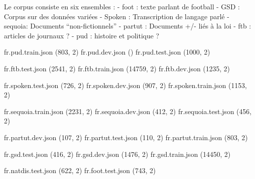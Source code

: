 \documentclass{report}
\begin{document}
Le corpus consiste en six ensembles :
- foot : texte parlant de football  
- GSD : Corpus sur des données variées
- Spoken : Transcription de langage parlé
- sequoia: Documents ``non-fictionnels''
- partut : Documents +/- liés à la loi
- ftb : articles de journaux ?
- pud : histoire et politique ?

fr.pud.train.json 	 (803, 2)
fr.pud.dev.json 	 ()
fr.pud.test.json 	 (1000, 2)

fr.ftb.test.json 	 (2541, 2)
fr.ftb.train.json 	 (14759, 2)
fr.ftb.dev.json 	 (1235, 2)

fr.spoken.test.json 	 (726, 2)
fr.spoken.dev.json 	 (907, 2)
fr.spoken.train.json 	 (1153, 2)

fr.sequoia.train.json 	 (2231, 2)
fr.sequoia.dev.json 	 (412, 2)
fr.sequoia.test.json 	 (456, 2)

fr.partut.dev.json 	 (107, 2)
fr.partut.test.json 	 (110, 2)
fr.partut.train.json 	 (803, 2)

fr.gsd.test.json 	 (416, 2)
fr.gsd.dev.json 	 (1476, 2)
fr.gsd.train.json 	 (14450, 2)


fr.natdis.test.json 	 (622, 2)
fr.foot.test.json 	 (743, 2) 
\end{document}
